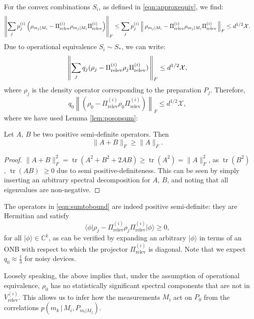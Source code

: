 For the convex combinations $S_i$, as defined in \ref{eqn:approxequiv}, we find:
\begin{equation*}
\left\|\sum_j p_j^{(i)}\left(\rho_{m_j\vert M_i}-\Pi_{\text{relev}}^{(i)}\rho_{m_j\vert M_i}\Pi_{\text{relev}}^{(i)}\right)\right\|_F \leq \sum_j p_j^{(i)}\left\|\thinspace\rho_{m_j\vert M_i}-\Pi_{\text{relev}}^{(i)}\rho_{m_j\vert M_i}\Pi_{\text{relev}}^{(i)}\thinspace\right\|_F \leq d^{1/2}\mathcal{X}.
\end{equation*}
Due to operational equivalence $S_i\sim S_{*}$, we can write:
\begin{equation*}
\left\|\sum_j q_j(\rho_{j}-\Pi_{\text{relev}}^{(i)}\rho_{j}\Pi_{\text{relev}}^{(i)})\thinspace\right\|_F \leq d^{1/2}\mathcal{X},
\end{equation*}
where $\rho_{j}$ is the density operator corresponding to the preparation $P_j$.
Therefore,
\begin{equation}
\label{eqn:sumtobound}
q_0\left\|(\rho_{0}-\Pi_{\text{relev}}^{(i)}\rho_{0}\Pi_{\text{relev}}^{(i)})\right\|_F \leq d^{1/2}\mathcal{X},
\end{equation}
where we have used Lemma \ref{lem:posopsum}:
\begin{lemma}
\label{lem:posopsum}
Let $A$, $B$ be two positive semi-definite operators. Then
\begin{equation*}
\|A+B\|_F \geq \|A\|_F.
\end{equation*}
\end{lemma}
\begin{proof}
$\|A+B\|_F^2=\operatorname{tr}(A^2+B^2+2AB)\geq \operatorname{tr}(A^2)=\|A\|_F^2$, as $\operatorname{tr}(B^2)$, $\operatorname{tr}(AB)$ $\geq 0$ due to semi positive-definiteness. This can be seen by simply inserting an arbitrary spectral decomposition for $A$, $B$, and noting that all eigenvalues are non-negative.
\end{proof}
The operators in \ref{eqn:sumtobound} are indeed positive semi-definite: they are Hermitian and satisfy
\begin{equation*}
\langle \phi \vert \rho_{j}-\Pi_{\text{relev}}^{(i)}\rho_{j}\Pi_{\text{relev}}^{(i)} \vert \phi \rangle \geq 0,
\end{equation*}
for all $\vert \phi\rangle\in\mathbb{C}^k$, as can be verified by expanding an arbitrary $\vert \phi \rangle $ in terms of an ONB with respect to which the projector $\Pi_{\text{relev}}^{(i)}$ is diagonal. Note that we expect $q_0\approx\frac{1}{3}$ for noisy devices.

Loosely speaking, the above implies that, under the assumption of operational equivalence, $\rho_0$ has no statistically significant spectral components that are not in $V_{\text{relev}}^{(i)}$. This allows us to infer how the measurements $M_i$ act on $P_0$ from the correlations $p(m_k \, \vert \, M_i , P_{m_l\vert M_j} )$.

